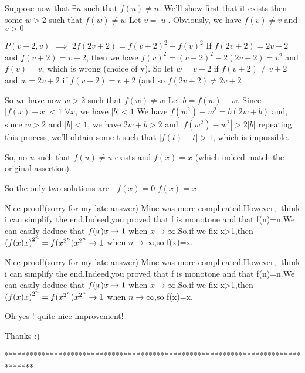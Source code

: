 \begin{solution}
Suppose now that $ \exists u$ such that $ f(u)\neq u$. We'll show first that it exists then some $ w>2$ such that $ f(w)\neq w$
Let $ v=|u|$. Obviously, we have $ f(v)\neq v$ and $ v>0$

$ P(v+2,v)$ $ \implies$ $ 2f(2v+2)=f(v+2)^2-f(v)^2$
If $ f(2v+2)=2v+2$ and $ f(v+2)=v+2$, then we have $ f(v)^2=(v+2)^2-2(2v+2)=v^2$ and $ f(v)=v$, which is wrong (choice of v).
So let $ w=v+2$ if $ f(v+2)\neq v+2$ and $ w=2v+2$ if $ f(v+2)=v+2$ (and so $ f(2v+2)\neq 2v+2$

So we have now $ w>2$ such that $ f(w)\neq w$ Let $ b=f(w)-w$. Since $ |f(x)-x|<1$ $ \forall x$, we have $ |b|<1$
We have $ f(w^2)-w^2=b(2w+b)$ and, since $ w>2$ and $ |b|<1$, we have $ 2w+b > 2$ and $ |f(w^2)-w^2|>2|b|$
repeating this process, we'll obtain some t such that $ |f(t)-t|>1$, which is impossible.

So, no $ u$ such that $ f(u)\neq u$ exists and $ f(x)=x$ (which indeed match the original assertion).

So the only two solutions are :
$ f(x)=0$
$ f(x)=x$
\end{solution}



\begin{solution}
	Nice proof!(sorry for my late answer)
Mine was more complicated.However,i think i can simplify the end.Indeed,you proved that f is monotone and that f(n)=n.We can easily deduce that $ f(x)\/x\rightarrow 1$ when $ x\rightarrow\infty$.So,if we fix x>1,then $ \left(f(x)\/x\right)^{2^n}=f(x^{2^n})\/x^{2^n}\rightarrow 1$ when $ n\rightarrow\infty$,so f(x)=x.
\end{solution}



\begin{solution}
	\begin{tcolorbox}Nice proof!(sorry for my late answer)
Mine was more complicated.However,i think i can simplify the end.Indeed,you proved that f is monotone and that f(n)=n.We can easily deduce that $ f(x)\/x\rightarrow 1$ when $ x\rightarrow\infty$.So,if we fix x>1,then $ \left(f(x)\/x\right)^{2^n} = f(x^{2^n})\/x^{2^n}\rightarrow 1$ when $ n\rightarrow\infty$,so f(x)=x.\end{tcolorbox}

Oh yes ! quite nice improvement!

Thanks :)
\end{solution}
*******************************************************************************
-------------------------------------------------------------------------------

